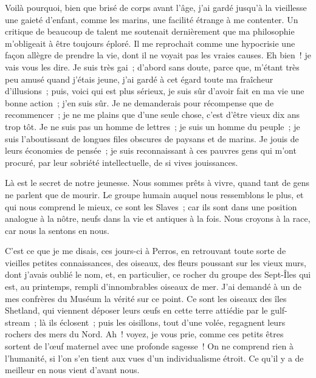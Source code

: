 \documentclass[french,twoside]{book} %
\newcommand\orgName[1]{#1}
\newcommand\placeName[1]{#1}
\begin{document}
Voilà pourquoi, bien que brisé de corps avant l’âge, j’ai gardé jusqu’à la vieillesse une gaieté d’enfant, comme les marins, une facilité étrange à me contenter. Un critique de beaucoup de talent me soutenait dernièrement que ma philosophie m’obligeait à être toujours éploré. Il me reprochait comme une hypocrisie une façon allègre de prendre la vie, dont il ne voyait pas les vraies causes. Eh bien ! je vais vous les dire. Je suis très gai ; d’abord sans doute, parce que, m’étant très peu amusé quand j’étais jeune, j’ai gardé à cet égard toute ma fraîcheur d’illusions ; puis, voici qui est plus sérieux, je suis sûr d’avoir fait en ma vie une bonne action ; j’en suis sûr. Je ne demanderais pour récompense que de recommencer ; je ne me plains que d’une seule chose, c’est d’être vieux dix ans trop tôt. Je ne suis pas un homme de lettres ; je suis un homme du peuple ; je suis l’aboutissant de longues files obscures de paysans et de marins. Je jouis de leurs économies de pensée ; je suis reconnaissant à ces pauvres gens qui m’ont procuré, par leur sobriété intellectuelle, de si vives jouissances.\par
Là est le secret de notre jeunesse. Nous sommes prêts à vivre, quand tant de gens ne parlent que de mourir. Le groupe humain auquel nous ressemblons le plus, et qui nous comprend le mieux, ce sont les {\orgName Slaves} ; car ils sont dans une position analogue à la nôtre, neufs dans la vie et antiques à la fois. Nous croyons à la race, car nous la sentons en nous.\par
C’est ce que je me disais, ces jours-ci à Perros, en retrouvant toute sorte de vieilles petites connaissances, des oiseaux, des fleurs poussant sur les vieux murs, dont j’avais oublié le nom, et, en particulier, ce rocher du groupe des Sept-Îles qui est, au printemps, rempli d’innombrables oiseaux de mer. J’ai demandé à un de mes confrères du {\orgName Muséum} la vérité sur ce point. Ce sont les oiseaux des {\placeName îles Shetland}, qui viennent déposer leurs œufs en cette terre attiédie par le gulf-stream ; là ils éclosent ; puis les oisillons, tout d’une volée, regagnent leurs rochers des {\placeName mers du Nord}. Ah ! voyez, je vous prie, comme ces petits êtres sortent de l’œuf maternel avec une profonde sagesse ! On ne comprend rien à l’humanité, si l’on s’en tient aux vues d’un individualisme étroit. Ce qu’il y a de meilleur en nous vient d’avant nous.\par
\end{document}
